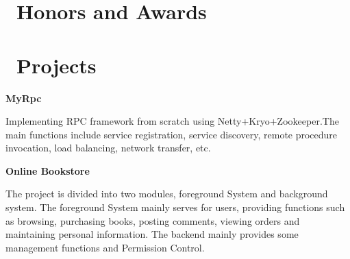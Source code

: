\documentclass{resume}
\begin{document}
\section{\faHeartO\ Honors and Awards}

\section{\faInfo\ Projects}
\textbf{MyRpc}


   Implementing RPC framework from scratch using Netty+Kryo+Zookeeper.The main functions include service registration, service discovery, remote procedure invocation, load balancing, network transfer, etc.
   
   
\textbf{Online Bookstore}


   The project is divided into two modules, foreground System and background system. The foreground System mainly serves for users, providing functions such as browsing, purchasing books, posting comments, viewing orders and maintaining personal information. The backend mainly provides some management functions and Permission Control.

%
%
\end{document}
